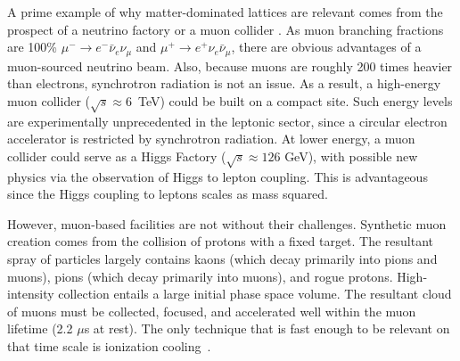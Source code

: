 \documentclass{jacow}
\begin{document}
A prime example of why matter-dominated lattices are relevant comes from the prospect of a neutrino factory or a muon collider \cite{map}. As muon branching fractions are 100\% $\mu^-\rightarrow e^- \bar{\nu}_e \nu_\mu$ and $\mu^+\rightarrow e^+ \nu_e \bar{\nu}_\mu$, there are obvious advantages of a muon-sourced neutrino beam. Also, because muons are roughly 200 times heavier than electrons, synchrotron radiation is not an issue. As a result, a high-energy muon collider ($\sqrt{s}\approx 6$~TeV) could be built on a compact site. Such energy levels are experimentally unprecedented in the leptonic sector, since a circular electron accelerator is restricted by synchrotron radiation. At lower energy, a muon collider could serve as a Higgs Factory ($\sqrt{s} \approx 126$ GeV), with possible new physics via the observation of Higgs to lepton coupling. This is advantageous since the Higgs coupling to leptons scales as mass squared. 


However, muon-based facilities are not without their challenges. Synthetic muon creation comes from the collision of protons with a fixed target. The resultant spray of particles largely contains kaons (which decay primarily into pions and muons), pions (which decay primarily into muons), and rogue protons. High-intensity collection entails a large initial phase space volume. The resultant cloud of muons must be collected, focused, and accelerated well within the muon lifetime (2.2 $\mu$s at rest). The only technique that is fast enough to be relevant on that time scale is ionization cooling~\cite{Parkhomchuk}.



\end{document}
